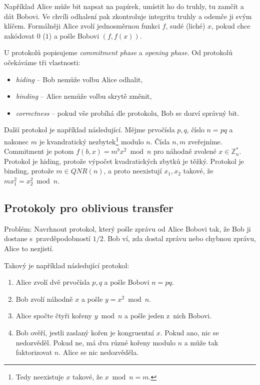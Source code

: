 Například Alice může bit napsat na papírek, umístit ho do truhly, tu
zamčít a dát Bobovi. Ve chvíli odhalení pak zkontroluje integritu truhly
a odemče ji svým klíčem.  Formálněji Alice zvolí jednosměrnou funkci
$f$, sudé (liché) $x$, pokud chce zakódovat $0$ ($1$) a pošle Bobovi
$(f, f(x))$.

U protokolů popisujeme {\em commitment phase} a {\em opening phase}.
Od protokolů očekáváme tři vlastnosti:
\begin{itemize}
    \item {\em hiding} -- Bob nemůže volbu Alice odhalit,
    \item {\em binding} -- Alice nemůže volbu skrytě změnit,
    \item {\em correctness} -- pokud vše probíhá dle protokolu, Bob se dozví správný bit.
\end{itemize}

Další protokol je například následující. Mějme prvočísla $p,q$,
číslo $n = pq$ a nakonec $m$ je kvandratický nezbytek\footnote{Tedy
neexistuje $x$ takové, že $x \bmod n = m$.} modulo $n$. Čísla $n, m$
zveřejníme.  Commitment je potom $f(b, x) = m^b x^2 \bmod n$ pro náhodně
zvolené $x \in \mathbb{Z}^*_n$. Protokol je hiding, protože výpočet
kvadratických zbytků je těžký. Protokol je binding, protože $m \in
QNR(n)$, a proto neexistují $x_1, x_2$ takové, že
$m x_1^2 = x_2^2 \bmod n$.


\subsection{Protokoly pro oblivious transfer}

Problém: Navrhnout protokol, který pošle zprávu od Alice Bobovi tak, že
Bob ji dostane s~pravděpodobností $1/2$. Bob ví, zda dostal zprávu nebo
chybnou zprávu, Alice to nezjistí.

Takový je například následující protokol:
\begin{enumerate}
    \item Alice zvolí dvě prvočísla $p,q$ a pošle Bobovi $n = pq$.
    \item Bob zvolí náhodně $x$ a pošle $y = x^2 \bmod n$.
    \item Alice spočte čtyři kořeny $y \bmod n$ a pošle jeden z~nich
        Bobovi.
    \item Bob ověří, jestli zaslaný kořen je kongruentní $x$. Pokud ano,
        nic se nedozvěděl. Pokud ne, má dva různé kořeny modulo $n$ a
        může tak faktorizovat $n$. Alice se nic nedozvěděla.
\end{enumerate}

